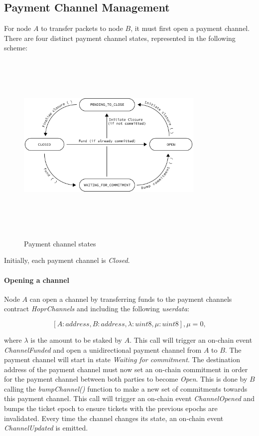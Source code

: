 \subsection{Payment Channel Management}
\label{sec:incentives:channels}

For node $A$ to transfer packets to node $B$, it must first open a payment channel. There are four distinct payment channel states, represented in the following scheme:

\begin{figure}[H]
    \centering
    \includegraphics[width=9cm,height=9cm,keepaspectratio]{../yellowpaper/images/statesTransition.png}
    \label{fig:payment channel states}
    \caption{Payment channel states}
\end{figure}
Initially, each payment channel is \textit{Closed}.

\paragraph{Opening a channel} Node $A$ can open a channel by transferring funds to the payment channels contract \textit{HoprChannels} and including the following \textit{userdata}:

$$[A: address, B: address, \lambda: uint8, \mu: uint8], \mu = 0,$$

where $\lambda$ is the amount to be staked by $A$. This call will trigger an on-chain event \textit{ChannelFunded} and open a unidirectional payment channel from $A$ to $B$. The payment channel will start in state \textit{Waiting for commitment}. The destination address of the payment channel must now set an on-chain commitment in order for the payment channel between both parties to become \textit{Open}. This is done by $B$ calling the \textit{bumpChannel()} function to make a new set of commitments towards this payment channel. This call will trigger an on-chain event \textit{ChannelOpened} and bumps the ticket epoch to ensure tickets with the previous epochs are invalidated. Every time the channel changes its state, an on-chain event \textit{ChannelUpdated} is emitted.

